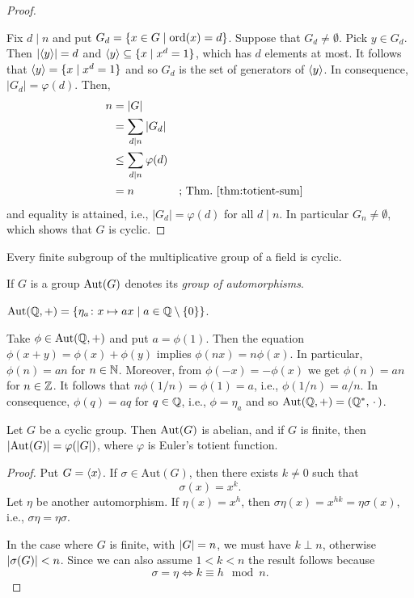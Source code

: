 \begin{proof} \citep{59911}

    Fix $d\mid n$ and put $G_d=\{x\in G\mid {\rm ord}(x)=d\}$. Suppose that $G_d\ne\emptyset$. Pick $y\in G_d$. Then $|\langle y\rangle|=d$ and $\langle y\rangle\subseteq\{x\mid x^d=1\}$, which has $d$ elements at most. It follows that $\langle y\rangle=\{x\mid x^d=1\}$ and so $G_d$ is the set of generators of $\langle y\rangle$. In consequence, $|G_d|=\varphi(d)$. Then,
    \begin{align*}
        n &= |G|\\
            &= \sum_{d\mid n}|G_d|\\
            &\le \sum_{d\mid n}\varphi(d)\\
            &= n    &&\text{; Thm.~\ref{thm:totient-sum}}
    \end{align*}
    and equality is attained, i.e., $|G_d|=\varphi(d)$ for all $d\mid n$. In particular $G_n\ne\emptyset$, which shows that $G$ is cyclic.
\end{proof}

\begin{cor}\label{cor:multiplicative-subgroup-of-field-is-cyclic}
    Every finite subgroup of the multiplicative group of a field is cyclic.
\end{cor}

\begin{ntn}
    If\/ $G$ is a group  ${\rm Aut}(G)$ denotes its \textsl{group of automorphisms}.
\end{ntn}

\begin{xmpl}\label{xmpl:Aut(Q,+)}
    ${\rm Aut}(\mathbb{Q},+)=\{\eta_a\colon x\mapsto ax\mid a\in\mathbb{Q}\setminus\{0\}\}$.

    Take $\phi\in{\rm Aut}(\mathbb{Q},+)$ and put $a=\phi(1)$. Then the equation $\phi(x+y)=\phi(x)+\phi(y)$ implies $\phi(nx)=n\phi(x)$. In particular, $\phi(n)=an$ for $n\in\mathbb{N}$. Moreover, from $\phi(-x)=-\phi(x)$ we get $\phi(n)=an$ for $n\in\mathbb{Z}$. It follows that $n\phi(1/n)=\phi(1)=a$, i.e., $\phi(1/n)=a/n$. In consequence, $\phi(q)=aq$ for $q\in\mathbb{Q}$, i.e., $\phi=\eta_a$ and so ${\rm Aut}(\mathbb{Q},+)=(\mathbb{Q}^*,\,\cdot\,)$.
\end{xmpl}


\begin{lem}
    Let $G$ be a cyclic group. Then ${\rm Aut}(G)$ is abelian, and if\/ $G$ is finite, then $|{\rm Aut}(G)| = \varphi(|G|)$, where $\varphi$ is Euler's totient function.
\end{lem}

\begin{proof} Put $G=\langle x\rangle$. If\/ $\sigma\in\text{Aut}(G)$, then there exists $k\ne0$ such that
$$
    \sigma(x)=x^k.
$$
Let $\eta$ be another automorphism. If $\eta(x)=x^h$, then $\sigma\eta(x)=x^{hk}=\eta\sigma(x)$, i.e., $\sigma\eta=\eta\sigma$.

In the case where $G$ is finite, with $\left\vert{G}\right\vert=n$, we must have $k\perp n$, otherwise $\left\vert{\sigma(G)}\right\vert < n$. Since we can also assume $1<k<n$ the result follows because
$$
    \sigma=\eta \iff k\equiv h\mod n.
$$
 \end{proof}


